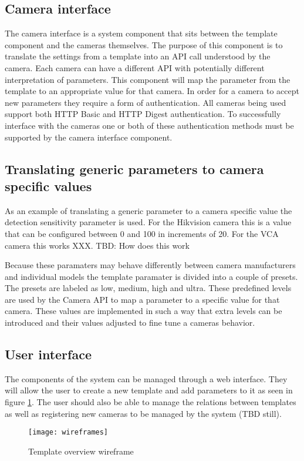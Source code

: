 \subsection{Camera interface}
The camera interface is a system component that sits between the template component and the cameras themselves. The purpose of this component
is to translate the settings from a template into an API call understood by the camera. Each camera can have a different API with potentially different interpretation of parameters. This component will map the parameter from the template to an appropriate value for that camera.
In order for a camera to accept new parameters they require a form of authentication. All cameras being used support both HTTP Basic and HTTP Digest authentication.
To successfully interface with the cameras one or both of these authentication methods must be supported by the camera interface component.

\subsection{Translating generic parameters to camera specific values}
As an example of translating a generic parameter to a camera specific value the detection sensitivity parameter is used.
For the Hikvision camera this is a value that can be configured between 0 and 100 in increments of 20.
For the VCA camera this works XXX. TBD: How does this work

Because these paramaters may behave differently between camera manufacturers and individual models the template paramater is divided into a couple of presets. The presets are labeled as low, medium, high and ultra. These predefined levels are used by the Camera API to map a parameter to a specific value for that camera. These values are implemented in such a way that extra levels can be introduced and their values adjusted to fine tune a cameras behavior.

\subsection{User interface}
The components of the system can be managed through a web interface.
They will allow the user to create a new template and add parameters to it as seen in figure \ref{fig:templatewireframe}.
The user should also be able to manage the relations between templates as well as registering new cameras to be managed by the system (TBD still).
\begin{figure}[h!]
	\centering
	\texttt{[image: wireframes]}
	\caption{Template overview  wireframe}
	\label{fig:templatewireframe}
\end{figure}

